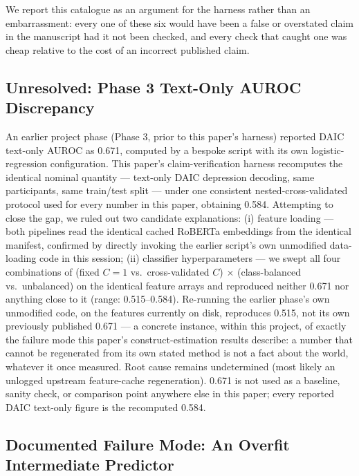 \documentclass[letterpaper]{article}
\begin{document}
We report this catalogue as an argument for the harness rather than an embarrassment: every one of these six would have been a false or overstated claim in the manuscript had it not been checked, and every check that caught one was cheap relative to the cost of an incorrect published claim.

\subsection{Unresolved: Phase 3 Text-Only AUROC Discrepancy}

An earlier project phase (Phase 3, prior to this paper's harness) reported DAIC text-only AUROC as 0.671, computed by a bespoke script with its own logistic-regression configuration. This paper's claim-verification harness recomputes the identical nominal quantity — text-only DAIC depression decoding, same participants, same train/test split — under one consistent nested-cross-validated protocol used for every number in this paper, obtaining 0.584. Attempting to close the gap, we ruled out two candidate explanations: (i) feature loading — both pipelines read the identical cached RoBERTa embeddings from the identical manifest, confirmed by directly invoking the earlier script's own unmodified data-loading code in this session; (ii) classifier hyperparameters — we swept all four combinations of (fixed $C{=}1$ vs.\ cross-validated $C$) $\times$ (class-balanced vs.\ unbalanced) on the identical feature arrays and reproduced neither 0.671 nor anything close to it (range: 0.515--0.584). Re-running the earlier phase's own unmodified code, on the features currently on disk, reproduces 0.515, not its own previously published 0.671 — a concrete instance, within this project, of exactly the failure mode this paper's construct-estimation results describe: a number that cannot be regenerated from its own stated method is not a fact about the world, whatever it once measured. Root cause remains undetermined (most likely an unlogged upstream feature-cache regeneration). 0.671 is not used as a baseline, sanity check, or comparison point anywhere else in this paper; every reported DAIC text-only figure is the recomputed 0.584.

\subsection{Documented Failure Mode: An Overfit Intermediate Predictor}
\end{document}

